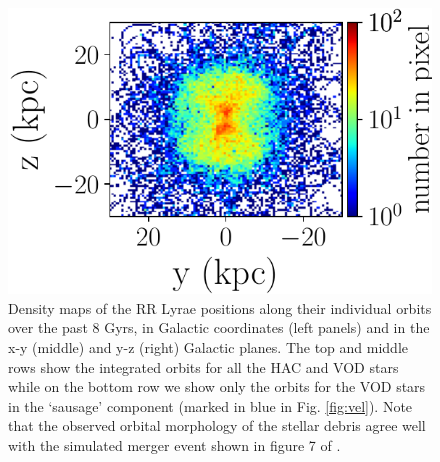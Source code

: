 \documentclass[fleqn,usenatbib]{mnras}
\begin{document}
\begin{figure}
             \includegraphics[scale=0.302]{VOD_orbits_8Gyrs_yz_1116.pdf}
\vspace{-0.45cm}
   \caption{Density maps of the RR Lyrae positions along their
     individual orbits over the past 8 Gyrs, in Galactic coordinates
     (left panels) and in the x-y (middle) and y-z (right) Galactic
     planes.  The top and middle rows show the integrated orbits for
     all the HAC and VOD stars while on the bottom row we show only
     the orbits for the VOD stars in the `sausage' component (marked
     in blue in Fig. \ref{fig:vel}). Note that the observed orbital
     morphology of the stellar debris agree well with the simulated
     merger event shown in figure 7 of \citet{Simion2018}.}
    \label{fig:backorbits}
\end{figure}
%
%
\end{document}
